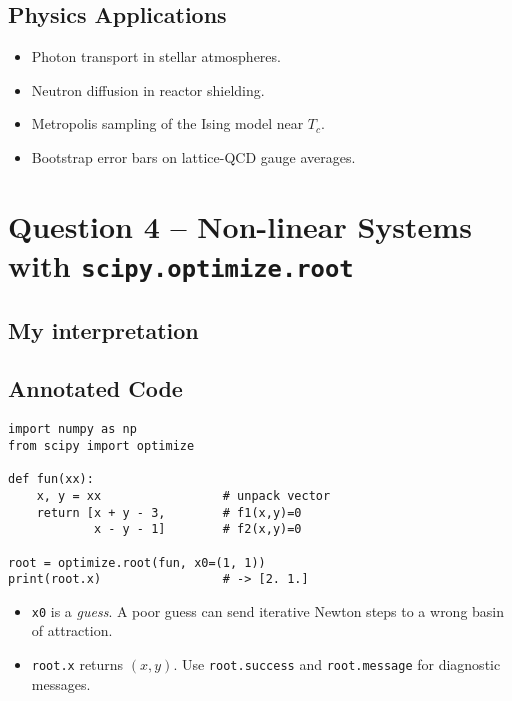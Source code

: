 \documentclass[a4paper,11pt]{article}
\begin{document}
\subsection{Physics Applications}
\begin{itemize}
  \item Photon transport in stellar atmospheres.
  \item Neutron diffusion in reactor shielding.
  \item Metropolis sampling of the Ising model near $T_c$.
  \item Bootstrap error bars on lattice-QCD gauge averages.
\end{itemize}

\section{Question 4 – Non-linear Systems with \texttt{scipy.optimize.root}}
\subsection{My interpretation}

\subsection{Annotated Code}

\begin{lstlisting}
import numpy as np
from scipy import optimize

def fun(xx):
    x, y = xx                 # unpack vector
    return [x + y - 3,        # f1(x,y)=0
            x - y - 1]        # f2(x,y)=0

root = optimize.root(fun, x0=(1, 1))
print(root.x)                 # -> [2. 1.]
\end{lstlisting}

\begin{itemize}
  \item \lstinline|x0| is a \emph{guess}. A poor guess can send iterative Newton steps to a wrong basin of attraction.
  \item \lstinline|root.x| returns $(x,y)$.  Use \lstinline|root.success| and \lstinline|root.message| for diagnostic messages.
\end{itemize}
\end{document}
